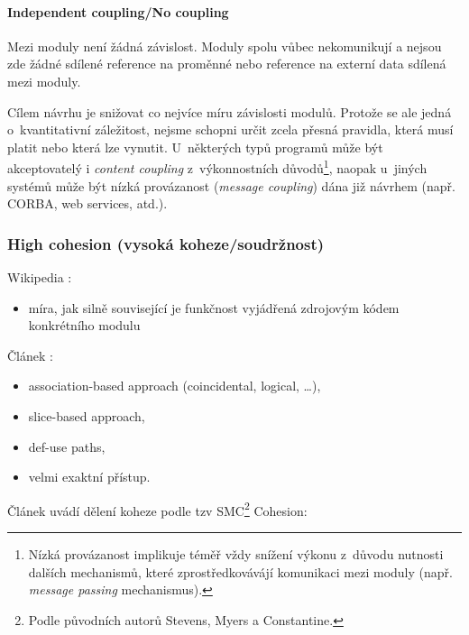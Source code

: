 \paragraph{Independent coupling/No coupling} Mezi moduly není žádná závislost. Moduly spolu vůbec nekomunikují a nejsou zde žádné sdílené reference na proměnné nebo reference na externí data sdílená mezi moduly.

\vspace{1cm}

Cílem návrhu je snižovat co nejvíce míru závislosti modulů. Protože se ale jedná o~kvantitativní záležitost, nejsme schopni určit zcela přesná pravidla, která musí platit nebo která lze vynutit. U~některých typů programů může být akceptovatelý i \emph{content coupling} z~výkonnostních důvodů\footnote{Nízká provázanost implikuje téměř vždy snížení výkonu z~důvodu nutnosti dalších mechanismů, které zprostředkovávájí komunikaci mezi moduly (např. \emph{message passing} mechanismus).}, naopak u~jiných systémů může být nízká provázanost (\emph{message coupling}) dána již návrhem (např. CORBA, web services, atd.).


\subsubsection{High cohesion (vysoká koheze/soudržnost)}

Wikipedia \cite{wiki:cohesion}:
\begin{itemize}
\item míra, jak silně související je funkčnost vyjádřená zdrojovým kódem konkrétního modulu
\end{itemize}

Článek \cite{Kang:1996:DCM:872750.873361}:
\begin{itemize}
\item association-based approach (coincidental, logical, \ldots),
\item slice-based approach,
\item def-use paths,
\item velmi exaktní přístup.
\end{itemize}

Článek \cite{ISI:000079726000029} uvádí dělení koheze podle tzv SMC\footnote{Podle původních autorů Stevens, Myers a Constantine.} Cohesion:

